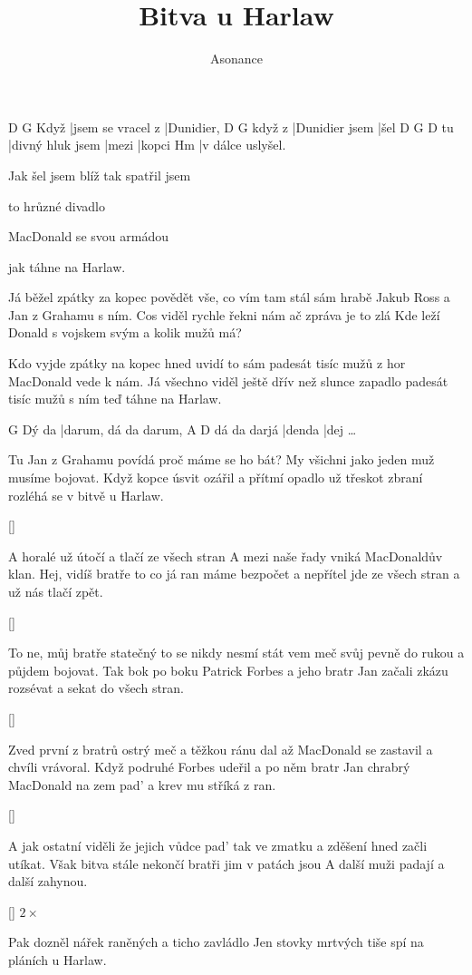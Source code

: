 \documentclass{song}
\title{Bitva u Harlaw}
\author{Asonance}
\begin{document}
\begin{multicols}{2}

\strophe
     D                 G
Když |jsem se vracel z |Dunidier,
       D              G
když z |Dunidier jsem |šel
   D                G     D
tu |divný hluk jsem |mezi |kopci
Hm
|v dálce uslyšel.

Jak šel jsem blíž tak spatřil jsem

to hrůzné divadlo

MacDonald se svou armádou

jak táhne na Harlaw.
\endstrophe

\strophe*
Já běžel zpátky za kopec
povědět vše, co vím
tam stál sám hrabě Jakub Ross
a Jan z Grahamu s ním.
Cos viděl rychle řekni nám
ač zpráva je to zlá
Kde leží Donald s vojskem svým
a kolik mužů má?
\endstrophe

\strophe*
Kdo vyjde zpátky na kopec
hned uvidí to sám
padesát tisíc mužů z hor
MacDonald vede k nám.
Já všechno viděl ještě dřív
než slunce zapadlo
padesát tisíc mužů s ním
teď táhne na Harlaw.
\endstrophe

      G
Dý da |darum, dá da darum,
            A      D
dá da darjá |denda |dej \ldots
\endstrophe

\strophe*
Tu Jan z Grahamu povídá
proč máme se ho bát?
My všichni jako jeden muž
musíme bojovat.
Když kopce úsvit ozářil
a přítmí opadlo
už třeskot zbraní rozléhá se
v bitvě u Harlaw.
\endstrophe

\ref{}

\columnbreak

\strophe*
A horalé už útočí
a tlačí ze všech stran
A mezi naše řady vniká
MacDonaldův klan.
Hej, vidíš bratře to co já
ran máme bezpočet
a nepřítel jde ze všech stran
a už nás tlačí zpět.
\endstrophe

\ref{}

\strophe*
To ne, můj bratře statečný
to se nikdy nesmí stát
vem meč svůj pevně do rukou
a půjdem bojovat.
Tak bok po boku Patrick Forbes
a jeho bratr Jan
začali zkázu rozsévat
a sekat do všech stran.
\endstrophe

\ref{}

\strophe*
Zved první z bratrů ostrý meč
a těžkou ránu dal
až MacDonald se zastavil
a chvíli vrávoral.
Když podruhé Forbes udeřil
a po něm bratr Jan
chrabrý MacDonald na zem pad’
a krev mu stříká z ran.
\endstrophe

\ref{}

\strophe*
A jak ostatní viděli
že jejich vůdce pad’
tak ve zmatku a zděšení
hned začli utíkat.
Však bitva stále nekončí
bratři jim v patách jsou
A další muži padají
a další zahynou.
\endstrophe

\ref{} $2\times$

\strophe*
Pak dozněl nářek raněných
a ticho zavládlo
Jen stovky mrtvých tiše spí
na pláních u Harlaw.
\endstrophe

\end{multicols}
\end{document}
